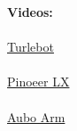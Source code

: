 \documentclass[12pt]{article}
\begin{document}
\begin{description}
                
            \newpage
            \textbf{ Videos:} \\\\
       \href{https://youtu.be/wXPLH_2IRVw}{Turlebot}\\\\
                \href{https://youtu.be/_kBWxSbnIPU}{Pinoeer LX}\\\\
                \href{https://youtu.be/lcICvz5jMHw}{Aubo Arm}\\
%                    
%                    
                    
         
            
\end{description}
\end{document}
